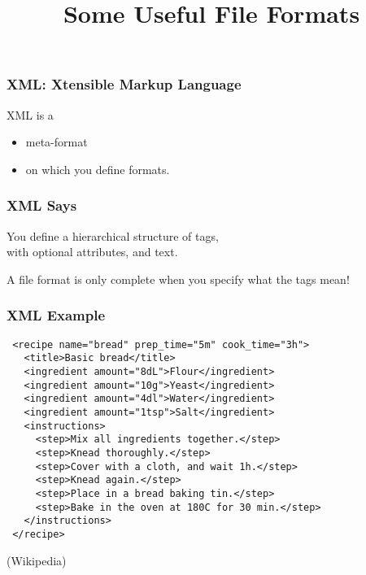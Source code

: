 
\title{Some Useful File Formats}

\frame{\maketitle}

\begin{frame}[fragile]
\frametitle{XML: Xtensible Markup Language}
\alert{XML} is a 
\begin{itemize}
\item meta-format
\item on which you define formats.
\end{itemize}
\end{frame}

\begin{frame}[fragile]
\frametitle{XML Says}

You define a \alert{hierarchical structure} of tags,\\
with optional attributes, and text.

\bigskip

A file format is only complete when you specify what the tags mean!
\end{frame}

\begin{frame}[fragile]
\frametitle{XML Example}
\begin{verbatim}
 <recipe name="bread" prep_time="5m" cook_time="3h">
   <title>Basic bread</title>
   <ingredient amount="8dL">Flour</ingredient>
   <ingredient amount="10g">Yeast</ingredient>
   <ingredient amount="4dl">Water</ingredient>
   <ingredient amount="1tsp">Salt</ingredient>
   <instructions>
     <step>Mix all ingredients together.</step>
     <step>Knead thoroughly.</step>
     <step>Cover with a cloth, and wait 1h.</step>
     <step>Knead again.</step>
     <step>Place in a bread baking tin.</step>
     <step>Bake in the oven at 180C for 30 min.</step>
   </instructions>
 </recipe>
\end{verbatim}
\begin{flushright}
(Wikipedia)
\end{flushright}
\end{frame}

